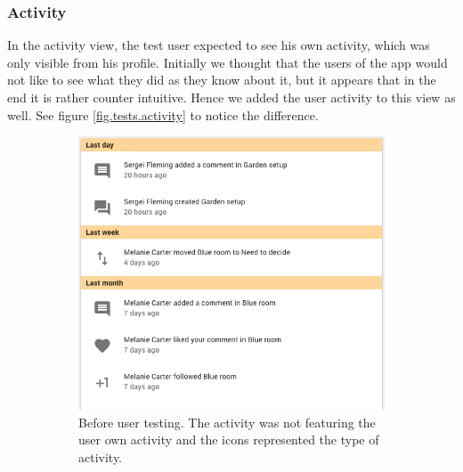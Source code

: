 \documentclass[a4paper,12pt,twoside]{article}
\begin{document}
\subsubsection*{Activity}
In the activity view, the test user expected to see his own activity, which was only visible from his profile.
Initially we thought that the users of the app would not like to see what they did as they know about it, but it appears that in the end it is rather counter intuitive.
Hence we added the user activity to this view as well.
See figure \ref{fig.tests.activity} to notice the difference.

\begin{figure}[!htb]
    \begin{subfigure}[t]{.495\textwidth}
        \includegraphics[width=\textwidth]{images/user_tests/activity_before.png}
        \caption{Before user testing. The activity was not featuring the user own activity and the icons represented the type of activity.}
        \label{fig.tests.activity.before}
    \end{subfigure}
    \hfill
    \begin{subfigure}[t]{.495\textwidth}

\end{subfigure}
\end{figure}
\end{document}
